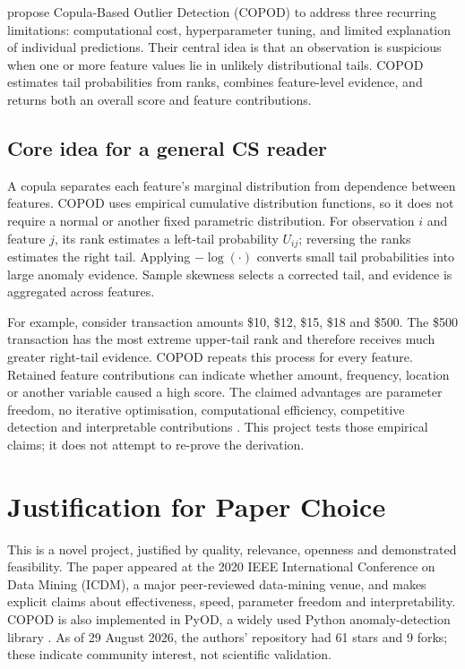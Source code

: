 \documentclass[11pt,a4paper,twocolumn]{article}
\begin{document}
\citet{li2020copod} propose Copula-Based Outlier Detection (COPOD) to address three recurring limitations: computational cost, hyperparameter tuning, and limited explanation of individual predictions. Their central idea is that an observation is suspicious when one or more feature values lie in unlikely distributional tails. COPOD estimates tail probabilities from ranks, combines feature-level evidence, and returns both an overall score and feature contributions.

\subsection{Core idea for a general CS reader}

A copula separates each feature's marginal distribution from dependence between features. COPOD uses empirical cumulative distribution functions, so it does not require a normal or another fixed parametric distribution. For observation $i$ and feature $j$, its rank estimates a left-tail probability $U_{ij}$; reversing the ranks estimates the right tail. Applying $-\log(\cdot)$ converts small tail probabilities into large anomaly evidence. Sample skewness selects a corrected tail, and evidence is aggregated across features.

For example, consider transaction amounts \$10, \$12, \$15, \$18 and \$500. The \$500 transaction has the most extreme upper-tail rank and therefore receives much greater right-tail evidence. COPOD repeats this process for every feature. Retained feature contributions can indicate whether amount, frequency, location or another variable caused a high score. The claimed advantages are parameter freedom, no iterative optimisation, computational efficiency, competitive detection and interpretable contributions \citep{li2020copod}. This project tests those empirical claims; it does not attempt to re-prove the derivation.

\section{Justification for Paper Choice}

This is a novel project, justified by quality, relevance, openness and demonstrated feasibility. The paper appeared at the 2020 IEEE International Conference on Data Mining (ICDM), a major peer-reviewed data-mining venue, and makes explicit claims about effectiveness, speed, parameter freedom and interpretability. COPOD is also implemented in PyOD, a widely used Python anomaly-detection library \citep{zhao2019pyod}. As of 29 August 2026, the authors' repository had 61 stars and 9 forks; these indicate community interest, not scientific validation.
\end{document}
